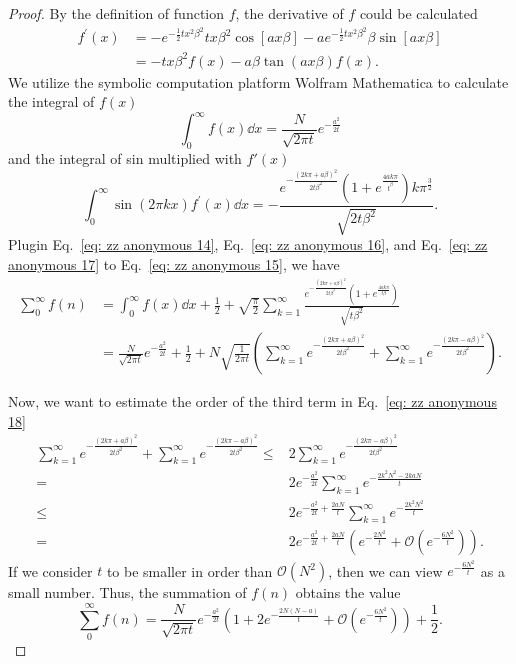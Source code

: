 \documentclass{article}
\begin{document}
\begin{proof}
By the definition of function $f$, the derivative of $f$ could be calculated
\begin{align}
f^{\prime}(x) & =-e^{-\frac{1}{2} t x^2 \beta^2} t x \beta^2 \cos [a x \beta]-a e^{-\frac{1}{2} t x^2 \beta^2} \beta \sin [a x \beta] \\
\label{eq: zz anonymous 14}
& =-t x \beta^2 f(x)-a \beta \tan (a x \beta) f(x). 
\end{align}
We utilize the symbolic computation platform Wolfram Mathematica to calculate the integral of $f(x)$
\begin{equation}
\label{eq: zz anonymous 17}
    \int_0^{\infty} f(x) \dd x = \frac{N}{\sqrt{2\pi t}} e^{-\frac{a^2}{2t}}
\end{equation}
and the integral of sin multiplied with $f'(x)$
\begin{equation}
    \int_0^{\infty} \sin (2 \pi k x) f^{\prime}(x) \dd x=-\frac{e^{-\frac{(2 k \pi+a \beta)^2}{2 t \beta^2}}\left(1+e^{\frac{4 a k \pi}{t^\beta}}\right) k \pi^{\frac{3}{2}}}{\sqrt{2 t \beta^2}}.
    \label{eq: zz anonymous 16}
\end{equation}
Plugin Eq.~\eqref{eq: zz anonymous 14}, Eq.~\eqref{eq: zz anonymous 16}, and Eq.~\eqref{eq: zz anonymous 17} to Eq.~\eqref{eq: zz anonymous 15}, we have 
\begin{align}
\sum_0^{\infty} f(n) & =\int_0^{\infty} f(x) \dd x+\frac{1}{2}+\sqrt{\frac{\pi}{2}} \sum_{k=1}^{\infty} \frac{e^{-\frac{(2 k \pi+a \beta)^2}{2 t \beta^2}}\left(1+e^{\frac{4 a k \pi}{t \beta}}\right)}{\sqrt{t \beta^2}} \\
& =\frac{N}{\sqrt{2\pi t}} e^{-\frac{a^2}{2t}}+\frac{1}{2}+N\sqrt{\frac{1}{2\pi t }}\left(\sum_{k=1}^{\infty} e^{-\frac{(2 k \pi+a \beta)^2}{2 t \beta^2}}+\sum_{k=1}^{\infty} e^{-\frac{(2 k \pi-a \beta)^2}{2 t \beta^2}}\right).
\label{eq: zz anonymous 18}
\end{align}

Now, we want to estimate the order of the third term in Eq.~\eqref{eq: zz anonymous 18}
\begin{align}
    \sum_{k=1}^{\infty} e^{-\frac{(2 k \pi+a \beta)^2}{2 t \beta^2}}+\sum_{k=1}^{\infty} e^{-\frac{(2 k \pi-a \beta)^2}{2 t \beta^2}} 
    \leq & 2\sum_{k=1}^{\infty} e^{-\frac{(2 k \pi-a \beta)^2}{2 t \beta^2}} \\
    =& 2 e^{-\frac{a^2}{2t}} \sum_{k=1}^{\infty} e^{-\frac{2 k^2 N^2-2kaN}{t}} \\
    \leq& 2 e^{-\frac{a^2}{2t} + \frac{2aN}{t}}\sum_{k=1}^{\infty} e^{-\frac{2 k^2 N^2}{t}} \\
    = &  2 e^{-\frac{a^2}{2t} + \frac{2aN}{t}} \left( e^{-\frac{2  N^2}{t}} + \mathcal{O}(e^{-\frac{6N^2}{t}}) \right).
\end{align}
If we consider $t$ to be smaller in order than $\mathcal{O}(N^2)$, then we can view $e^{-\frac{6N^2}{t}}$ as a small number.  Thus, the summation of $f(n)$ obtains the value
\begin{equation}
    \sum_0^{\infty} f(n) = \frac{N}{\sqrt{2\pi t}} e^{-\frac{a^2}{2t}}\left( 1+ 2e^{-\frac{2N(N-a)}{t}} + \mathcal{O}(e^{-\frac{6N^2}{t}})\right)+\frac{1}{2}.
\end{equation}


\end{proof}
\end{document}
